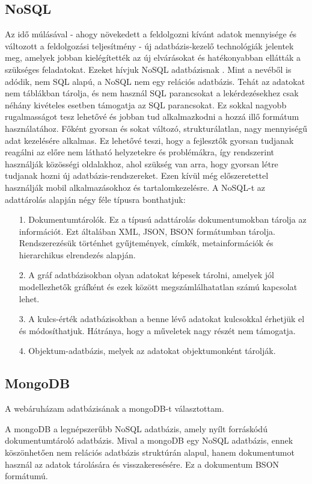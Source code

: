 \subsection{NoSQL}
Az idő múlásával - ahogy növekedett a feldolgozni kívánt adatok mennyisége és változott a feldolgozási teljesítmény - új adatbázis-kezelő technológiák jelentek meg, amelyek jobban kielégítették az új elvárásokat és hatékonyabban ellátták a szükséges feladatokat. Ezeket hívjuk NoSQL adatbázisnak \cite{12}. Mint a nevéből is adódik, nem SQL alapú, a NoSQL nem egy relációs adatbázis. Tehát az adatokat nem táblákban tárolja, és nem használ SQL parancsokat a lekérdezésekhez csak néhány kivételes esetben támogatja az SQL parancsokat. Ez sokkal nagyobb rugalmasságot tesz lehetővé és jobban tud alkalmazkodni a hozzá illő formátum használatához. Főként gyorsan és sokat változó, strukturálatlan, nagy mennyiségű adat kezelésére alkalmas. Ez lehetővé teszi, hogy a fejlesztők gyorsan tudjanak reagálni az előre nem látható helyzetekre és problémákra, így rendszerint használják közösségi oldalakhoz, ahol szükség van arra, hogy gyorsan létre tudjanak hozni új adatbázis-rendszereket. Ezen kívül még előszeretettel használják mobil alkalmazásokhoz és tartalomkezelésre. 
A NoSQL-t az adattárolás alapján négy féle típusra bonthatjuk: 
\begin{itemize}
    \item[1.]Dokumentumtárolók. Ez a típusú adattárolás dokumentumokban tárolja az információt. Ezt általában XML, JSON, BSON formátumban tárolja. Rendszerezésük történhet gyűjtemények, címkék, metainformációk és hierarchikus elrendezés alapján.
    \item[2.]A gráf adatbázisokban olyan adatokat képesek tárolni, amelyek jól modellezhetők gráfként és ezek között megszámlálhatatlan számú kapcsolat lehet. 
    \item[3.]A kulcs-érték adatbázisokban a benne lévő adatokat kulcsokkal érhetjük el és módosíthatjuk. Hátránya, hogy a műveletek nagy részét nem támogatja.
    \item[4.]Objektum-adatbázis, melyek az adatokat objektumonként tárolják.
\end{itemize}


\subsection{MongoDB}
A webáruházam adatbázisának a mongoDB-t választottam.

A mongoDB \cite{13} a legnépszerűbb NoSQL adatbázis, amely nyílt forráskódú dokumentumtároló adatbázis. Mival a mongoDB egy NoSQL adatbázis, ennek köszönhetően nem relációs adatbázis struktúrán alapul, hanem dokumentumot használ az adatok tárolására és visszakeresésére. Ez a dokumentum BSON formátumú.

